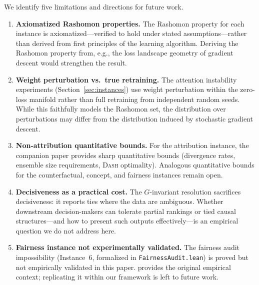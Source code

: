 \documentclass{article}
\newcommand{\DASH}{\textsc{Dash}}
\begin{document}
We identify five limitations and directions for future work.
\begin{enumerate}
  \item \textbf{Axiomatized Rashomon properties.}  The Rashomon property for
    each instance is axiomatized---verified to hold under stated
    assumptions---rather than derived from first principles of the learning
    algorithm.  Deriving the Rashomon property from, e.g., the loss landscape
    geometry of gradient descent would strengthen the result.
  \item \textbf{Weight perturbation vs.\ true retraining.}  The attention
    instability experiments (Section~\ref{sec:instances}) use weight
    perturbation within the zero-loss manifold rather than full retraining from
    independent random seeds.  While this faithfully models the Rashomon set,
    the distribution over perturbations may differ from the distribution induced
    by stochastic gradient descent.
  \item \textbf{Non-attribution quantitative bounds.}  For the attribution
    instance, the companion paper provides sharp quantitative bounds (divergence
    rates, ensemble size requirements, \DASH{} optimality).  Analogous
    quantitative bounds for the counterfactual, concept, and fairness instances
    remain open.
  \item \textbf{Decisiveness as a practical cost.}  The $G$-invariant
    resolution sacrifices decisiveness: it reports ties where the data are
    ambiguous.  Whether downstream decision-makers can tolerate partial rankings
    or tied causal structures---and how to present such outputs
    effectively---is an empirical question we do not address here.
  \item \textbf{Fairness instance not experimentally validated.}  The fairness
    audit impossibility (Instance~6, formalized in \texttt{FairnessAudit.lean})
    is proved but not empirically validated in this paper.
    \citet{chouldechova2017fair} provides the original empirical context;
    replicating it within our framework is left to future work.
\end{enumerate}



\end{document}
